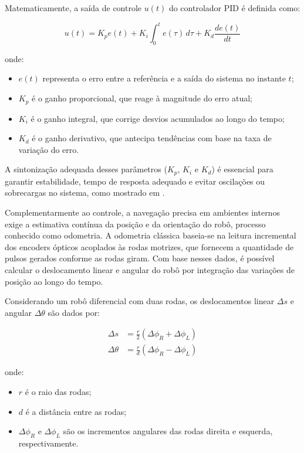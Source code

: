 \documentclass[	12pt, Times, openright, twoside, a4paper, english, brazil]{abntex2}
\begin{document}
Matematicamente, a saída de controle \( u(t) \) do controlador PID é definida como:

\begin{equation}
u(t) = K_p e(t) + K_i \int_{0}^{t} e(\tau)\, d\tau + K_d \frac{de(t)}{dt}
\end{equation}

onde:
\begin{itemize}
	\item \( e(t) \) representa o erro entre a referência e a saída do sistema no instante \( t \);
	\item \( K_p \) é o ganho proporcional, que reage à magnitude do erro atual;
	\item \( K_i \) é o ganho integral, que corrige desvios acumulados ao longo do tempo;
	\item \( K_d \) é o ganho derivativo, que antecipa tendências com base na taxa de variação do erro.
\end{itemize}

A sintonização adequada desses parâmetros (\( K_p \), \( K_i \) e \( K_d \)) é essencial para garantir estabilidade, tempo de resposta adequado e evitar oscilações ou sobrecargas no sistema, como mostrado em .

Complementarmente ao controle, a navegação precisa em ambientes internos exige a estimativa contínua da posição e da orientação do robô, processo conhecido como odometria. A odometria clássica baseia-se na leitura incremental dos encoders ópticos acoplados às rodas motrizes, que fornecem a quantidade de pulsos gerados conforme as rodas giram. Com base nesses dados, é possível calcular o deslocamento linear e angular do robô por integração das variações de posição ao longo do tempo.

Considerando um robô diferencial com duas rodas, os deslocamentos linear \( \Delta s \) e angular \( \Delta \theta \) são dados por: \cite{siegwart2011introduction}

\begin{align}
	\Delta s &= \frac{r}{2} (\Delta \phi_R + \Delta \phi_L) \\
	\Delta \theta &= \frac{r}{d} (\Delta \phi_R - \Delta \phi_L)
\end{align}

onde:
\begin{itemize}
	\item \( r \) é o raio das rodas;
	\item \( d \) é a distância entre as rodas;
	\item \( \Delta \phi_R \) e \( \Delta \phi_L \) são os incrementos angulares das rodas direita e esquerda, respectivamente.
\end{itemize}
\end{document}
